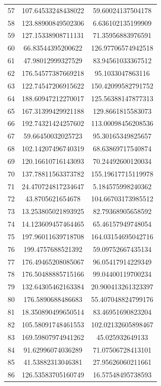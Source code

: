 \documentclass[a4paper,12pt,twoside,openany]{report}
\begin{document}
\begin{longtable}{*{3}{c}}
57	& 107.64533248438022	& 59.60024137504178	\\
58	& 123.88900849502306	& 6.636102135199909	\\
59	& 127.15338908711131	& 71.35956883976591	\\
60	& 66.83544395200622	& 126.97706574942518	\\
61	& 47.98012999327529	& 83.94561033367512	\\
62	& 176.54577387669218	& 95.1033047863116	\\
63	& 122.74547206915622	& 150.42099582791752	\\
64	& 188.60947212270017	& 125.56388147877313	\\
65	& 167.31399429921188	& 129.8661815583073	\\
66	& 192.74321424257602	& 113.00098456208536	\\
67	& 59.66450032025723	& 95.30165349825657	\\
68	& 102.14207496740319	& 68.63869717540874	\\
69	& 120.16610716143093	& 70.24492600120034	\\
70	& 137.78811563373782	& 155.19617715119978	\\
71	& 24.470724817234647	& 5.184575998240362	\\
72	& 43.8705621654678	& 104.66703173985512	\\
73	& 13.253805021893925	& 82.79368905658592	\\
74	& 14.123609457464465	& 65.46157949748054	\\
75	& 197.96011639718708	& 164.03154695042716	\\
76	& 199.4757688521392	& 59.09752667435134	\\
77	& 176.49465208085067	& 96.05417914229349	\\
78	& 176.50488885715166	& 99.04400119700234	\\
79	& 132.64305462163384	& 20.900413261323397	\\
80	& 176.5890688486683	& 55.407048824799176	\\
81	& 18.350890499650514	& 83.46951690823204	\\
82	& 105.58091748461553	& 102.02132605898467	\\
83	& 169.59807974941262	& 45.025932649133	\\
84	& 91.62996074036289	& 71.07506728413101	\\
85	& 41.53882313046381	& 27.95626060211661	\\
86	& 126.53583705160749	& 16.57548495738593	\\

\end{longtable}
\end{document}

